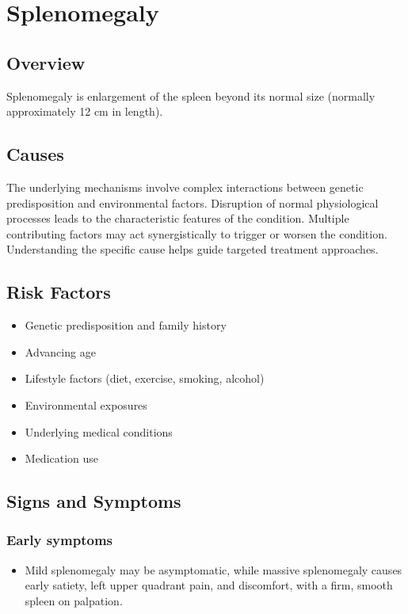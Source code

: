 \chapter{Splenomegaly}
\label{sec:Splenomegaly}

\section{Overview}
Splenomegaly is enlargement of the spleen beyond its normal size (normally approximately 12 cm in length).
\section{Causes}
The underlying mechanisms involve complex interactions between genetic predisposition and environmental factors. Disruption of normal physiological processes leads to the characteristic features of the condition. Multiple contributing factors may act synergistically to trigger or worsen the condition. Understanding the specific cause helps guide targeted treatment approaches.
\section{Risk Factors}


\begin{itemize}[noitemsep]
  \item Genetic predisposition and family history
  \item Advancing age
  \item Lifestyle factors (diet, exercise, smoking, alcohol)
  \item Environmental exposures
  \item Underlying medical conditions
  \item Medication use
\end{itemize}
\section{Signs and Symptoms}

\subsection{Early symptoms}
\begin{itemize}[noitemsep]
  \item Mild splenomegaly may be asymptomatic, while massive splenomegaly causes early satiety, left upper quadrant pain, and discomfort, with a firm, smooth spleen on palpation.
\end{itemize}

